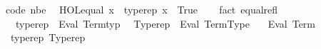 \begin{isabellebody}
\endisatagproof
{\isafoldproof}%
%
\isadelimproof
\isanewline
%
\endisadelimproof
\isanewline
{}\isamarkupfalse%
\ {\isacharbrackleft}{\kern0pt}code\ nbe{\isacharbrackright}{\kern0pt}{\isacharcolon}{\kern0pt}\isanewline
\ \ {\isachardoublequoteopen}HOL{\isachardot}{\kern0pt}equal\ {\isacharparenleft}{\kern0pt}x\ {\isacharcolon}{\kern0pt}{\isacharcolon}{\kern0pt}\ typerep{\isacharparenright}{\kern0pt}\ x\ {\isasymlongleftrightarrow}\ True{\isachardoublequoteclose}\isanewline
%
\isadelimproof
\ \ %
\endisadelimproof
%
\isatagproof
{}\isamarkupfalse%
\ {\isacharparenleft}{\kern0pt}fact\ equal{\isacharunderscore}{\kern0pt}refl{\isacharparenright}{\kern0pt}%
\endisatagproof
{\isafoldproof}%
%
\isadelimproof
\isanewline
%
\endisadelimproof
\isanewline
{}\isamarkupfalse%
\isanewline
\ \ \ typerep\ {\isasymrightharpoonup}\ {\isacharparenleft}{\kern0pt}Eval{\isacharparenright}{\kern0pt}\ {\isachardoublequoteopen}Term{\isachardot}{\kern0pt}typ{\isachardoublequoteclose}\isanewline
{\isacharbar}{\kern0pt}\ \ Typerep\ {\isasymrightharpoonup}\ {\isacharparenleft}{\kern0pt}Eval{\isacharparenright}{\kern0pt}\ {\isachardoublequoteopen}Term{\isachardot}{\kern0pt}Type{\isacharslash}{\kern0pt}\ {\isacharparenleft}{\kern0pt}{\isacharunderscore}{\kern0pt}{\isacharcomma}{\kern0pt}\ {\isacharunderscore}{\kern0pt}{\isacharparenright}{\kern0pt}{\isachardoublequoteclose}\isanewline
\isanewline
{}\isamarkupfalse%
\ Eval\ Term\isanewline
\isanewline
{}\isamarkupfalse%
\ {\isacharparenleft}{\kern0pt}\ typerep\ Typerep\isanewline
%
\isadelimtheory
\isanewline
%
\endisadelimtheory
%
\isatagtheory
{}\isamarkupfalse%
%
\endisatagtheory
{\isafoldtheory}%
%
\isadelimtheory
%
\endisadelimtheory
%
\end{isabellebody}%
\endinput
